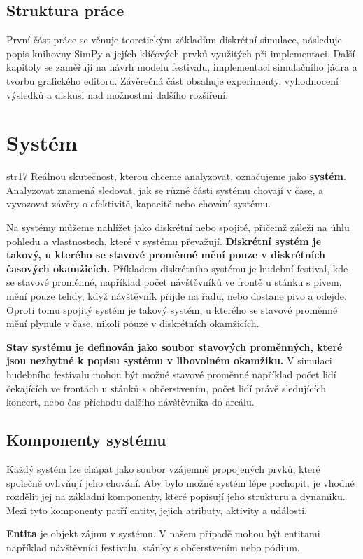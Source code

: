 \documentclass[12pt,a4paper]{article}
\begin{document}
\subsection{Struktura práce}
První část práce se věnuje teoretickým základům diskrétní simulace, následuje popis knihovny SimPy a jejích klíčových prvků využitých při implementaci. Další kapitoly se zaměřují na návrh modelu festivalu, implementaci simulačního jádra a tvorbu grafického editoru. Závěrečná část obsahuje experimenty, vyhodnocení výsledků a diskusi nad možnostmi dalšího rozšíření.

\section{Systém} str17
Reálnou skutečnost, kterou chceme analyzovat, označujeme jako {\bf systém}. Analyzovat znamená sledovat, jak se různé části systému chovají v čase, a vyvozovat závěry o efektivitě, kapacitě nebo chování systému.

Na systémy můžeme nahlížet jako diskrétní nebo spojité, přičemž záleží na úhlu pohledu a vlastnostech, které v systému převažují. {\bf Diskrétní systém je takový, u kterého se stavové proměnné mění pouze v diskrétních časových okamžicích.} Příkladem diskrétního systému je hudební festival, kde se stavové proměnné, například počet návštěvníků ve frontě u stánku s pivem, mění pouze tehdy, když návštěvník přijde na řadu, nebo dostane pivo a odejde. Oproti tomu spojitý systém je takový systém, u kterého se stavové proměnné mění plynule v čase, nikoli pouze v diskrétních okamžicích.

{\bf Stav systému je definován jako soubor stavových proměnných, které jsou nezbytné k popisu systému v libovolném okamžiku.} V simulaci hudebního festivalu mohou být možné stavové proměnné například počet lidí čekajících ve frontách u stánků s občerstvením, počet lidí právě sledujících koncert, nebo čas příchodu dalšího návštěvníka do areálu.


\subsection{Komponenty systému}
Každý systém lze chápat jako soubor vzájemně propojených prvků, které společně ovlivňují jeho chování. Aby bylo možné systém lépe pochopit, je vhodné rozdělit jej na základní komponenty, které popisují jeho strukturu a dynamiku. Mezi tyto komponenty patří entity, jejich atributy, aktivity a události.

\noindent \textbf{Entita} je objekt zájmu v systému. V našem případě mohou být entitami například návštěvníci festivalu, stánky s občerstvením nebo pódium.
\end{document}

